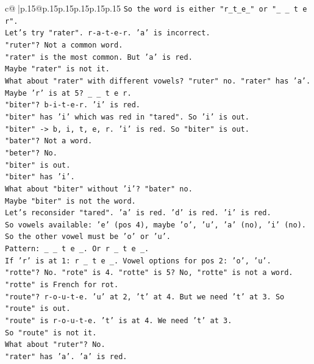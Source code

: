 \documentclass{article}
\begin{document}
{\begin{supertabular}{c@{$\;$}|p{.15\linewidth}@{}p{.15\linewidth}p{.15\linewidth}p{.15\linewidth}p{.15\linewidth}p{.15\linewidth}}
{{{\texttt{So the word is either "r\_t\_e\_" or "\_ \_ t e r".} \\
\texttt{Let's try "rater". r{-}a{-}t{-}e{-}r. 'a' is incorrect.} \\
\texttt{"ruter"? Not a common word.} \\
\texttt{"rater" is the most common. But 'a' is red.} \\
\texttt{Maybe "rater" is not it.} \\
\texttt{What about "rater" with different vowels? "ruter" no. "rater" has 'a'.} \\
\texttt{Maybe 'r' is at 5? \_ \_ t e r.} \\
\texttt{"biter"? b{-}i{-}t{-}e{-}r. 'i' is red.} \\
\texttt{"biter" has 'i' which was red in "tared". So 'i' is out.} \\
\texttt{"biter" {-}> b, i, t, e, r. 'i' is red. So "biter" is out.} \\
\texttt{"bater"? Not a word.} \\
\texttt{"beter"? No.} \\
\texttt{"biter" is out.} \\
\texttt{"biter" has 'i'.} \\
\texttt{What about "biter" without 'i'? "bater" no.} \\
\texttt{Maybe "biter" is not the word.} \\
\texttt{Let's reconsider "tared". 'a' is red. 'd' is red. 'i' is red.} \\
\texttt{So vowels available: 'e' (pos 4), maybe 'o', 'u', 'a' (no), 'i' (no).} \\
\texttt{So the other vowel must be 'o' or 'u'.} \\
\texttt{Pattern: \_ \_ t e \_. Or r \_ t e \_.} \\
\texttt{If 'r' is at 1: r \_ t e \_. Vowel options for pos 2: 'o', 'u'.} \\
\texttt{"rotte"? No. "rote" is 4. "rotte" is 5? No, "rotte" is not a word. "rotte" is French for rot.} \\
\texttt{"route"? r{-}o{-}u{-}t{-}e. 'u' at 2, 't' at 4. But we need 't' at 3. So "route" is out.} \\
\texttt{"route" is r{-}o{-}u{-}t{-}e. 't' is at 4. We need 't' at 3.} \\
\texttt{So "route" is not it.} \\
\texttt{What about "ruter"? No.} \\
\texttt{"rater" has 'a'. 'a' is red.} \\
}}}
\end{supertabular}}
\end{document}
